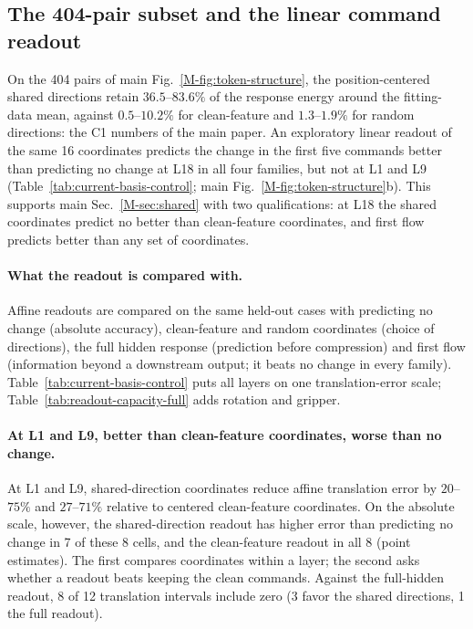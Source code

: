 \subsection{The 404-pair subset and the linear command readout}
\label{sec:current-basis-readout}

On the 404 pairs of main Fig.~\ref*{M-fig:token-structure}, the position-centered shared directions retain $36.5$--$83.6\%$ of the response energy around the fitting-data mean, against $0.5$--$10.2\%$ for clean-feature and $1.3$--$1.9\%$ for random directions: the C1 numbers of the main paper. An exploratory linear readout of the same 16 coordinates predicts the change in the first five commands better than predicting no change at L18 in all four families, but not at L1 and L9 (Table~\ref{tab:current-basis-control}; main Fig.~\ref*{M-fig:token-structure}b). This supports main Sec.~\ref*{M-sec:shared} with two qualifications: at L18 the shared coordinates predict no better than clean-feature coordinates, and first flow predicts better than any set of coordinates.

\paragraph{What the readout is compared with.}
Affine readouts are compared on the same held-out cases with predicting no change (absolute accuracy), clean-feature and random coordinates (choice of directions), the full hidden response (prediction before compression) and first flow (information beyond a downstream output; it beats no change in every family). Table~\ref{tab:current-basis-control} puts all layers on one translation-error scale; Table~\ref{tab:readout-capacity-full} adds rotation and gripper.

\paragraph{At L1 and L9, better than clean-feature coordinates, worse than no change.}
At L1 and L9, shared-direction coordinates reduce affine translation error by $20$--$75\%$ and $27$--$71\%$ relative to centered clean-feature coordinates. On the absolute scale, however, the shared-direction readout has higher error than predicting no change in 7 of these 8 cells, and the clean-feature readout in all 8 (point estimates). The first compares coordinates within a layer; the second asks whether a readout beats keeping the clean commands. Against the full-hidden readout, 8 of 12 translation intervals include zero (3 favor the shared directions, 1 the full readout).

